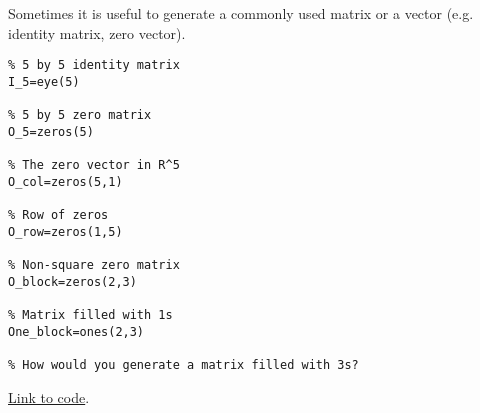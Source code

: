 \documentclass{ximera}
\begin{document}
\begin{template}\label{temp:id_matrix}
Sometimes it is useful to generate a commonly used matrix or a vector (e.g. identity matrix, zero vector). 
\begin{verbatim}
% 5 by 5 identity matrix
I_5=eye(5)

% 5 by 5 zero matrix
O_5=zeros(5)

% The zero vector in R^5
O_col=zeros(5,1)

% Row of zeros
O_row=zeros(1,5)

% Non-square zero matrix
O_block=zeros(2,3)

% Matrix filled with 1s
One_block=ones(2,3)

% How would you generate a matrix filled with 3s?
\end{verbatim}

\href{https://sagecell.sagemath.org/?z=eJxdzj0PgjAQBuCdhP9wC4kmOCBhNK46qAlx1vBxSGPtxbZY66-XYiHqcsPdc-9dBBmUti-sRqGZtnArtGTPMNiesxVanGXzMAiDaHQvlDSZQ29cQ03q2OKHPLDSJIEJyE-ZkxXx0caJ1zkZoGZYUM5IMt4k8Zi4J7FQ966Q-H-75FRdvV_Gqfe7YQ4N4xxrMEy3kLhwgX6BBH77Tf-DoY7XYKmDCwqUhUYo_KGfoFSt342kXHo=&lang=octave&interacts=eJyLjgUAARUAuQ==}{Link to code}.
\end{template}
\end{document}
